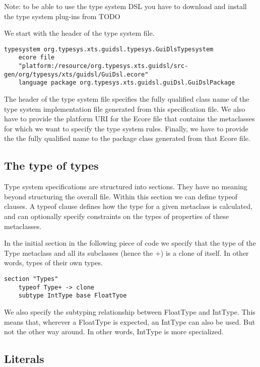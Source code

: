 Note: to be able to use the type system DSL you have to download and install the
type system plug-ins from TODO

We start with the header of the type system file.

\begin{lstlisting}[language=xts] 
typesystem org.typesys.xts.guidsl.typesys.GuiDlsTypesystem 
    ecore file 
    "platform:/resource/org.typesys.xts.guidsl/src-gen/org/typesys/xts/guidsl/GuiDsl.ecore"
    language package org.typesys.xts.guidsl.guiDsl.GuiDslPackage 
\end{lstlisting}

The header of the type system file specifies the fully qualified class name of
the type system implementation file generated from this specification file. We
also have to provide the platform URI for the Ecore file that contains the
metaclasses for which we want to specify the type system rules. Finally, we have
to provide the the fully qualified name  to the package class  generated from
that Ecore file.

\subsection{The type of types}

Type system specifications  are structured into sections. They have no meaning
beyond structuring the overall file. Within this section we can define typeof
clauses. A typeof clause defines how the type for a given metaclass is
calculated, and can optionally specify constraints on the types of properties of
these metaclasses.

In the initial section in the following piece of code we specify  that the type
of the Type metaclass and all its subclasses (hence the +) is a clone of itself.
In other words, types of their own types.

\begin{lstlisting}[language=xts] 
section "Types"
    typeof Type+ -> clone
    subtype IntType base FloatTyoe
\end{lstlisting}

We also specify the subtyping relationship between FloatType and IntType. This
means that, wherever a FloatType is expected, an IntType can also be used.  But
not the other way around. In other words, IntType is more specialized.

\subsection{Literals}

